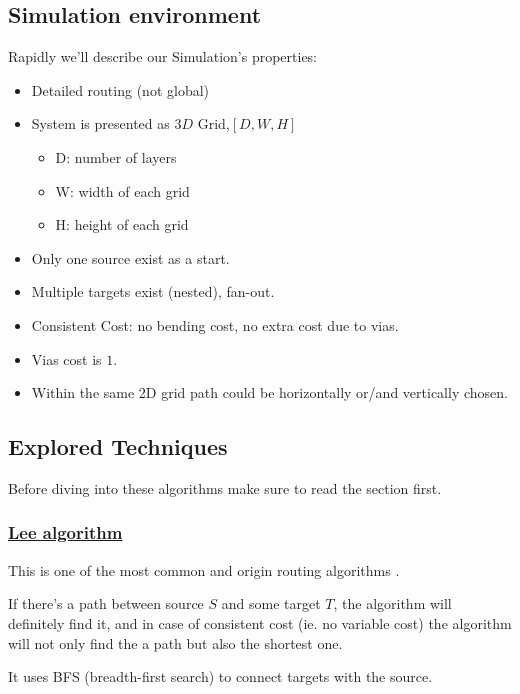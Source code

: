\subsection{Simulation environment}
    Rapidly we'll describe our Simulation's properties:
    \begin{itemize}
        \item Detailed routing (not global)
        \item System is presented as $3D$ Grid,$[D, W, H]$
        \begin{itemize}
            \item D: number of layers 
            \item W: width of each grid
            \item H: height of each grid
        \end{itemize}
        \item Only one source exist as a start.
        \item Multiple targets exist (nested), fan-out.          
        \item Consistent Cost: no bending cost, no extra cost due to vias.
        \item Vias cost is $1$.
        \item Within the same 2D grid path could be horizontally or/and vertically
            chosen.
    \end{itemize}

\subsection{Explored Techniques}
    Before diving into these algorithms make sure to read the  section first.
    \newline

    \subsubsection{\underline{Lee algorithm}}
    \label{LeeSection}
    This is one of the most common and origin routing algorithms \cite{LeeRef}.

    If there's a path between source $S$ and some target $T$, the algorithm will definitely find it,
    and in case of consistent cost (ie. no variable cost) the algorithm will not only find the 
    a path but also the shortest one.

    It uses BFS (breadth-first search) to connect targets with the source.


